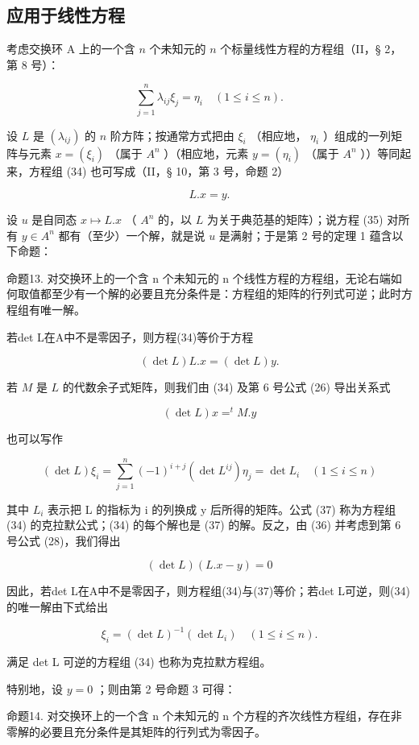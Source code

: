 \subsection{应用于线性方程}

考虑交换环 A 上的一个含 \(n\) 个未知元的 \(n\) 个标量线性方程的方程组（II，§ 2，第 8 号）：

\[
\sum_ {j = 1} ^ {n} \lambda_ {i j} \xi_ {j} = \eta_ {i} \quad (1 \leqslant i \leqslant n).\tag{34}
\]

设 \(L\) 是 \((\lambda_{ij})\) 的 \(n\) 阶方阵；按通常方式把由 \(\xi_i\) （相应地， \(\eta_i\) ）组成的一列矩阵与元素 \(x = (\xi_i)\) （属于 \(A^n\) ）（相应地，元素 \(y = (\eta_i)\) （属于 \(A^n\) ））等同起来，方程组 (34) 也可写成（II，§ 10，第 3 号，命题 2）

\[
L. x = y.\tag{35}
\]

设 \(u\) 是自同态 \(x \mapsto L.x\) （ \(A^n\) 的，以 \(L\) 为关于典范基的矩阵）；说方程 (35) 对所有 \(y \in A^n\) 都有（至少）一个解，就是说 \(u\) 是满射；于是第 2 号的定理 1 蕴含以下命题：

命题13. 对交换环上的一个含 n 个未知元的 n 个线性方程的方程组，无论右端如何取值都至少有一个解的必要且充分条件是：方程组的矩阵的行列式可逆；此时方程组有唯一解。

若det L在A中不是零因子，则方程(34)等价于方程

\[
(\det L) L. x = (\det L) y.
\]

若 \(M\) 是 \(L\) 的代数余子式矩阵，则我们由 (34) 及第 6 号公式 (26) 导出关系式

\[
(\det L) x = ^ {t} M. y\tag{36}
\]

也可以写作

\[
(\det L) \xi_ {i} = \sum_ {j = 1} ^ {n} (- 1) ^ {i + j} (\det L ^ {i j}) \eta_ {j} = \det L _ {i} \quad (1 \leqslant i \leqslant n)\tag{37}
\]

其中 \(L_{i}\) 表示把 L 的指标为 i 的列换成 y 后所得的矩阵。公式 (37) 称为方程组 (34) 的克拉默公式；(34) 的每个解也是 (37) 的解。反之，由 (36) 并考虑到第 6 号公式 (28)，我们得出

\[
(\det L) (L. x - y) = 0\tag{38}
\]

因此，若det L在A中不是零因子，则方程组(34)与(37)等价；若det L可逆，则(34)的唯一解由下式给出

\[
\xi_ {i} = (\det L) ^ {- 1} (\det L _ {i}) \quad (1 \leqslant i \leqslant n).\tag{39}
\]

满足 det L 可逆的方程组 (34) 也称为克拉默方程组。

特别地，设 \(y = 0\) ；则由第 2 号命题 3 可得：

命题14. 对交换环上的一个含 n 个未知元的 n 个方程的齐次线性方程组，存在非零解的必要且充分条件是其矩阵的行列式为零因子。

